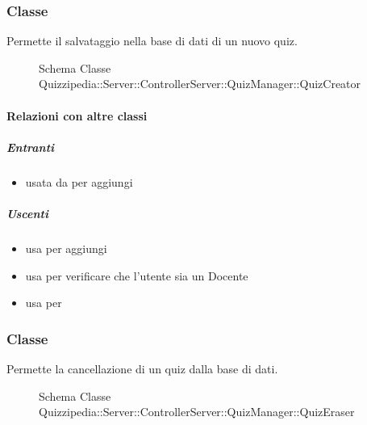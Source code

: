 \subsubsection{Classe }
Permette il salvataggio nella base di dati di un nuovo quiz.
\begin{figure}[H]
\centering
\noindent{}
\caption[Schema Classe QuizCreator]{Schema Classe Quizzipedia::Server::ControllerServer::QuizManager::QuizCreator}
\end{figure}
\paragraph{Relazioni con altre classi}
\subparagraph{Entranti}
\begin{itemize}
\item usata da  per aggiungi
\end{itemize}
\subparagraph{Uscenti}
\begin{itemize}
\item usa  per aggiungi
\item usa  per verificare che l'utente sia un Docente
\item usa  per 
\end{itemize}
\subsubsection{Classe }
Permette la cancellazione di un quiz dalla base di dati.
\begin{figure}[H]
\centering
\noindent{}
\caption[Schema Classe QuizEraser]{Schema Classe Quizzipedia::Server::ControllerServer::QuizManager::QuizEraser}
\end{figure}
